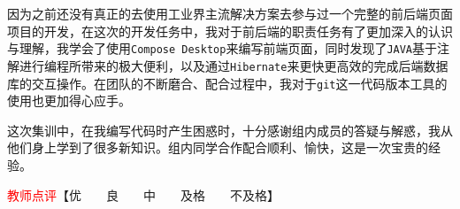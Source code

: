 \documentclass{article}
\begin{document}
因为之前还没有真正的去使用工业界主流解决方案去参与过一个完整的前后端页面项目的开发，在这次的开发任务中，我对于前后端的职责任务有了更加深入的认识与理解，我学会了使用\texttt{Compose Desktop}来编写前端页面，同时发现了\texttt{JAVA}基于注解进行编程所带来的极大便利，以及通过\texttt{Hibernate}来更快更高效的完成后端数据库的交互操作。在团队的不断磨合、配合过程中，我对于\texttt{git}这一代码版本工具的使用也更加得心应手。

这次集训中，在我编写代码时产生困惑时，十分感谢组内成员的答疑与解惑，我从他们身上学到了很多新知识。组内同学合作配合顺利、愉快，这是一次宝贵的经验。

\vfill
\noindent\textcolor{red}{教师点评}【优~~~~良~~~~中~~~~及格~~~~不及格】
\end{document}
